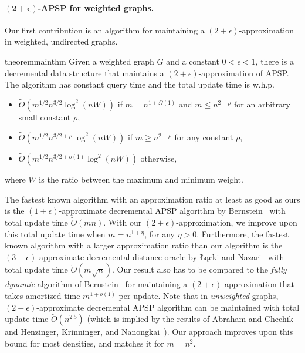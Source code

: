 \paragraph{$\mathbf{(2+\epsilon)}$-APSP for weighted graphs.} Our first contribution is an algorithm for maintaining a $ (2 + \epsilon) $-approximation in weighted, undirected graphs.

\begin{restatable}{theorem}{mainthm}\label{thm:main_mult}
    Given a weighted graph $G$ and a constant $0 < \epsilon < 1$, there is a decremental data structure that maintains a $(2+\epsilon)$-approximation of APSP. The algorithm has constant query time and the total update time is w.h.p.
    \begin{itemize}
        \item $\tilde O(m^{1/2}n^{3/2}\log^2(nW))$ if $m=n^{1+\Omega(1)}$ and $m\leq n^{2-\rho}$ for an arbitrary small constant $\rho$,
        \item $\tilde O(m^{1/2}n^{3/2+\rho}\log^2(nW))$ if $m\geq n^{2-\rho}$ for any constant $\rho$,
        \item $\tilde O(m^{1/2}n^{3/2+o(1)}\log^2(nW))$ otherwise,
    \end{itemize} where $W$ is the ratio between the maximum and minimum weight.
\end{restatable}


The fastest known algorithm with an approximation ratio at least as good as ours is the $ (1 + \epsilon) $-approximate decremental APSP algorithm by Bernstein~\cite{Bernstein16} with total update time $ \tilde O (m n) $. 
With our $ (2 + \epsilon) $-approximation, we improve upon this total update time when $ m =n^{1+\eta} $, for any $\eta>0$.
Furthermore, the fastest known algorithm with a larger approximation ratio than our algorithm is the $ (3 + \epsilon) $-approximate decremental distance oracle by Łącki and Nazari~\cite{LN2020} with total update time $ \tilde O (m \sqrt{n}) $. 
Our result also has to be compared to the \emph{fully dynamic} algorithm of Bernstein~\cite{Bernstein09} for maintaining a $ (2 + \epsilon) $-approximation that takes amortized time $ m^{1 + o(1)} $ per update.
Note that in \emph{unweighted} graphs, $ (2 + \epsilon) $-approximate decremental APSP algorithm can be maintained with total update time $ \tilde O (n^{2.5}) $ (which is implied by the results of Abraham and Chechik~\cite{AbrahamC13} and Henzinger, Krinninger, and Nanongkai~\cite{HKN2016}). Our approach improves upon this bound for most densities, and matches it for $m=n^2$.


